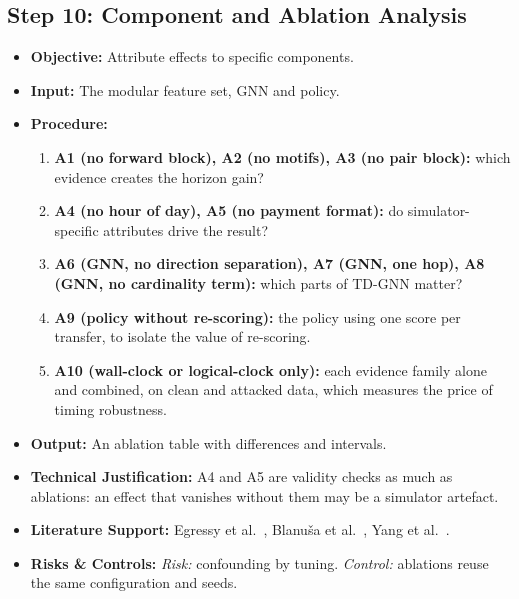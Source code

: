 \documentclass[11pt,a4paper]{article}
\begin{document}
\subsection{Step 10: Component and Ablation Analysis}
\begin{itemize}[leftmargin=*]
    \item \textbf{Objective:} Attribute effects to specific components.
    \item \textbf{Input:} The modular feature set, GNN and policy.
    \item \textbf{Procedure:}
    \begin{enumerate}[leftmargin=*]
        \item \textbf{A1 (no forward block), A2 (no motifs), A3 (no pair block):} which evidence creates the horizon gain?
        \item \textbf{A4 (no hour of day), A5 (no payment format):} do simulator-specific attributes drive the result?
        \item \textbf{A6 (GNN, no direction separation), A7 (GNN, one hop), A8 (GNN, no cardinality term):} which parts of TD-GNN matter?
        \item \textbf{A9 (policy without re-scoring):} the policy using one score per transfer, to isolate the value of re-scoring.
        \item \textbf{A10 (wall-clock or logical-clock only):} each evidence family alone and combined, on clean and attacked data, which measures the price of timing robustness.
    \end{enumerate}
    \item \textbf{Output:} An ablation table with differences and intervals.
    \item \textbf{Technical Justification:} A4 and A5 are validity checks as much as ablations: an effect that vanishes without them may be a simulator artefact.
    \item \textbf{Literature Support:} Egressy et al.\ \cite{egressy2024multigraph}, Blanu\v{s}a et al.\ \cite{blanusa2024gfp}, Yang et al.\ \cite{yang2025generaldyg}.
    \item \textbf{Risks \& Controls:} \textit{Risk:} confounding by tuning. \textit{Control:} ablations reuse the same configuration and seeds.
\end{itemize}

\end{document}
